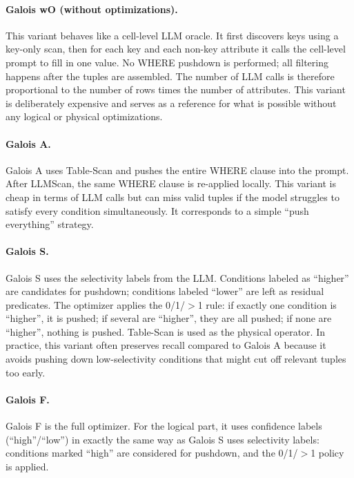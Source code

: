 \documentclass[11pt]{article}
\begin{document}
\paragraph{Galois wO (without optimizations).}

This variant behaves like a cell-level LLM oracle. It first discovers keys using a key-only
scan, then for each key and each non-key attribute it calls the cell-level prompt to fill in
one value. No WHERE pushdown is performed; all filtering happens after the tuples are
assembled. The number of LLM calls is therefore proportional to the number of rows
times the number of attributes. This variant is deliberately expensive and serves as a
reference for what is possible without any logical or physical optimizations.

\paragraph{Galois A.}

Galois A uses Table-Scan and pushes the entire WHERE clause into the prompt. After
LLMScan, the same WHERE clause is re-applied locally. This variant is cheap in terms
of LLM calls but can miss valid tuples if the model struggles to satisfy every condition
simultaneously. It corresponds to a simple ``push everything'' strategy.

\paragraph{Galois S.}

Galois S uses the selectivity labels from the LLM. Conditions labeled as ``higher'' are
candidates for pushdown; conditions labeled ``lower'' are left as residual predicates.
The optimizer applies the 0/1/$>$1 rule: if exactly one condition is ``higher'', it is
pushed; if several are ``higher'', they are all pushed; if none are ``higher'', nothing is
pushed. Table-Scan is used as the physical operator. In practice, this variant often
preserves recall compared to Galois A because it avoids pushing down low-selectivity
conditions that might cut off relevant tuples too early.

\paragraph{Galois F.}

Galois F is the full optimizer. For the logical part, it uses confidence labels
(``high''/``low'') in exactly the same way as Galois S uses selectivity labels: conditions
marked ``high'' are considered for pushdown, and the 0/1/$>$1 policy is applied.
\end{document}
